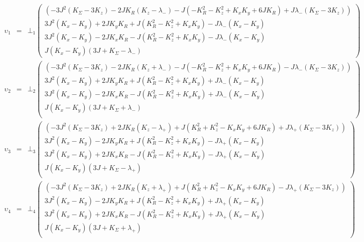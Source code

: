 \documentclass[aps,amsmath,twocolumn,amssymb,floatfix,showpacs,superscriptaddress,nofootinbib,longbibliography]{revtex4-1}
\begin{document}
\begin{widetext}
		\begin{eqnarray}
		\upsilon_1&=&\bot_1
		\begin{pmatrix}
			\left(-3J^2(K_{\Sigma}-3K_z)-2J K_{R} (K_z-\lambda_{-})-J\left(-K_{R}^2-K_z^2+K_x K_y+6J K_{R}\right)+J
			\lambda_{-} (K_{\Sigma}-3K_z)\right) \\
			3J^2(K_x-K_y)+2J K_y K_{R}+J\left(K_{R}^2-K_z^2+K_x K_y\right)-J \lambda_{-}(K_x-K_y)
			\\
			3J^2(K_x-K_y)-2J K_x K_{R} - J\left(K_{R}^2-K_z^2+K_x K_y\right)-J \lambda_{-}(K_x-K_y)
			\\
			J(K_x-K_y)(3J+K_{\Sigma}-\lambda_{-})
		\end{pmatrix}\\
		\upsilon_2&=&\bot_2
		\begin{pmatrix}
			\left(-3J^2(K_{\Sigma}-3K_z)-2J K_{R} (K_z+\lambda_{-})-J\left(-K_{R}^2-K_z^2+K_x K_y+6J K_{R}\right)-J
			\lambda_{-} (K_{\Sigma}-3K_z)\right) \\
			3J^2(K_x-K_y)+2J K_y K_{R}+J\left(K_{R}^2-K_z^2+K_x K_y\right)+J \lambda_{-}(K_x-K_y)
			\\
			3J^2(K_x-K_y)-2J K_x K_{R} - J\left(K_{R}^2-K_z^2+K_x K_y\right)+J \lambda_{-}(K_x-K_y)
			\\
			J(K_x-K_y)(3J+K_{\Sigma}+\lambda_{-}) \\
		\end{pmatrix}\\
		\upsilon_3&=&\bot_3
		\begin{pmatrix}
			\left(-3J^2(K_{\Sigma}-3K_z)+2J K_{R} (K_z-\lambda_{+})+J\left(K_{R}^2+K_z^2-K_x K_y+6J K_{R}\right)+J
			\lambda_{+} (K_{\Sigma}-3K_z)\right) \\
			3J^2(K_x-K_y)-2J K_y K_{R}+J\left(K_{R}^2-K_z^2+K_x K_y\right)-J \lambda_{+}(K_x-K_y)
			\\
			3J^2(K_x-K_y)+2J K_x K_{R} - J\left(K_{R}^2-K_z^2+K_x K_y\right)-J \lambda_{+}(K_x-K_y)
			\\
			J(K_x-K_y)(3J+K_{\Sigma}-\lambda_{+}) \\
		\end{pmatrix}\\
		\upsilon_4&=&\bot_4
		\begin{pmatrix}
			\left(-3J^2(K_{\Sigma}-3K_z)+2J K_{R} (K_z+\lambda_{+})+J\left(K_{R}^2+K_z^2-K_x K_y+6J K_{R}\right)-J
			\lambda_{+} (K_{\Sigma}-3K_z)\right) \\
			3J^2(K_x-K_y)-2J K_y K_{R}+J\left(K_{R}^2-K_z^2+K_x K_y\right)+J \lambda_{+}(K_x-K_y)
			\\
			3J^2(K_x-K_y)+2J K_x K_{R} - J\left(K_{R}^2-K_z^2+K_x K_y\right)+J \lambda_{+}(K_x-K_y)
			\\
			J(K_x-K_y)(3J+K_{\Sigma}+\lambda_{+}) \\	
		\end{pmatrix}
	\end{eqnarray}
\end{widetext}	
\end{document}
